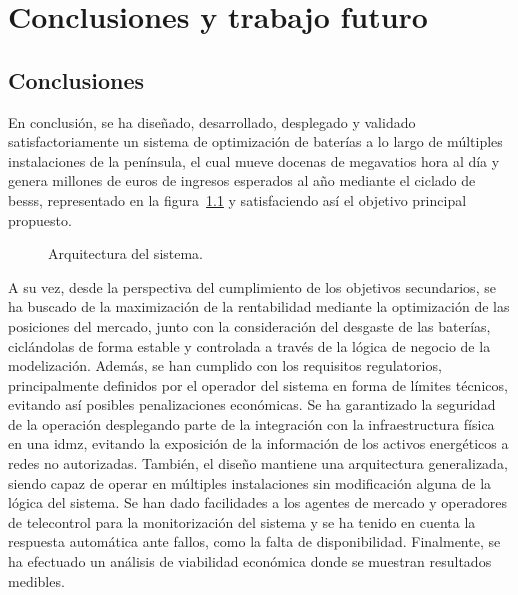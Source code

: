 \cleardoublepage

\chapter{Conclusiones y trabajo futuro}
\label{makereference8}

\section{Conclusiones}
\label{makereference8.1}

En conclusión, se ha diseñado, desarrollado, desplegado y validado satisfactoriamente un sistema de optimización de baterías a lo largo de múltiples instalaciones de la península, el cual mueve docenas de megavatios hora al día y genera millones de euros de ingresos esperados al año mediante el ciclado de \glspl{bess}, representado en la figura~\ref{fig:arquitectura-sistema} y satisfaciendo así el objetivo principal propuesto.

\begin{figure}
  \centering
  \caption[Arquitectura del sistema.]{Arquitectura del sistema.}
  \label{fig:arquitectura-sistema}
\end{figure}

A su vez, desde la perspectiva del cumplimiento de los objetivos secundarios, se ha buscado de la maximización de la rentabilidad mediante la optimización de las posiciones del mercado, junto con la consideración del desgaste de las baterías, ciclándolas de forma estable y controlada a través de la lógica de negocio de la modelización. Además, se han cumplido con los requisitos regulatorios, principalmente definidos por el operador del sistema en forma de límites técnicos, evitando así posibles penalizaciones económicas. Se ha garantizado la seguridad de la operación desplegando parte de la integración con la infraestructura física en una \gls{idmz}, evitando la exposición de la información de los activos energéticos a redes no autorizadas. También, el diseño mantiene una arquitectura generalizada, siendo capaz de operar en múltiples instalaciones sin modificación alguna de la lógica del sistema. Se han dado facilidades a los agentes de mercado y operadores de telecontrol para la monitorización del sistema y se ha tenido en cuenta la respuesta automática ante fallos, como la falta de disponibilidad. Finalmente, se ha efectuado un análisis de viabilidad económica donde se muestran resultados medibles.

